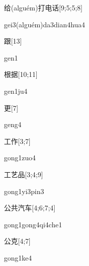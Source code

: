 \begin{verbete}{给(alguém)打电话}[9;5;5;8]
\begin{pronuncia}[\\]{gei3(alguém)da3dian4hua4}
\end{pronuncia}
\end{verbete}

\begin{verbete}[gen1]{跟}[13]
\begin{pronuncia}{gen1}
\end{pronuncia}
\end{verbete}

\begin{verbete}[gen1ju4]{根据}[10;11]
\begin{pronuncia}{gen1ju4}
\end{pronuncia}
\end{verbete}

\begin{verbete}[geng4]{更}[7]
\begin{pronuncia}{geng4}
\end{pronuncia}
\end{verbete}

\begin{verbete}{工作}[3;7]
\begin{pronuncia}{gong1zuo4}
\end{pronuncia}
\end{verbete}

\begin{verbete}{工艺品}[3;4;9]
\begin{pronuncia}{gong1yi3pin3}
\end{pronuncia}
\end{verbete}

\begin{verbete}{公共汽车}[4;6;7;4]
\begin{pronuncia}[\\]{gong1gong4qi4che1}
\end{pronuncia}
\end{verbete}

\begin{verbete}[gong1ke4]{公克}[4;7]
\begin{pronuncia}{gong1ke4}
\end{pronuncia}
\end{verbete}

